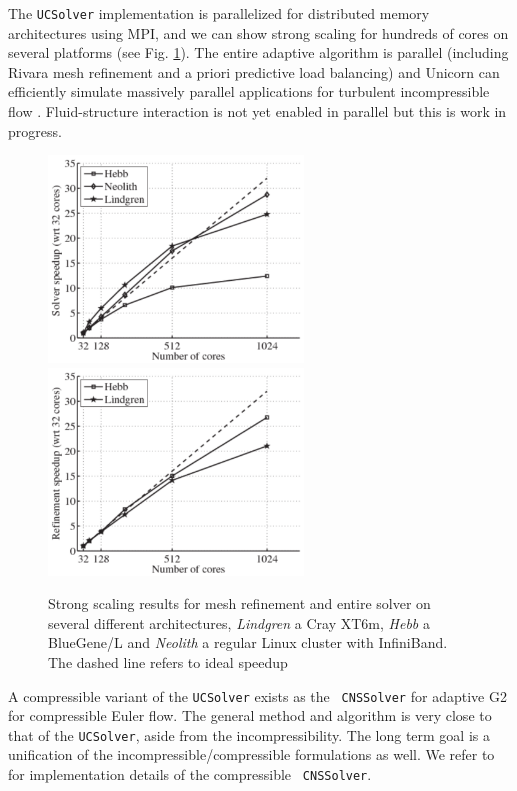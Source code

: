 The {\tt UCSolver} implementation is parallelized for distributed
memory architectures using MPI, and we can show strong scaling for
hundreds of cores on several platforms (see
Fig. \ref{fig:hoffman-2:sp}). The entire adaptive algorithm is
parallel (including Rivara mesh refinement and a priori predictive
load balancing) and Unicorn can efficiently simulate massively
parallel applications for turbulent incompressible
flow \cite{JanssonHoffmanJansson2010, Jansson2011}. Fluid-structure
interaction is not yet enabled in parallel but this is work in
progress.


\begin{figure}
\centering
\includegraphics[height=5.5cm]{unfinished/hoffman-2/pdf/speedup_solve.pdf}
\includegraphics[height=5.5cm]{unfinished/hoffman-2/pdf/speedup_unrivara.pdf}
\caption{\label{fig:hoffman-2:sp} Strong scaling results for mesh refinement and entire solver on several different architectures, \textit{Lindgren} a Cray XT6m, \textit{Hebb} a BlueGene/L and \textit{Neolith} a regular Linux cluster with InfiniBand. The dashed line refers to ideal speedup}
\end{figure}


A compressible variant of the {\tt UCSolver} exists as the {\tt
  CNSSolver} for adaptive G2 for compressible Euler flow. The general
method and algorithm is very close to that of the {\tt UCSolver},
aside from the incompressibility. The long term goal is a unification
of the incompressible/compressible formulations as well. We refer to
\cite{Nazarov2009} for implementation details of the compressible {\tt
  CNSSolver}.


